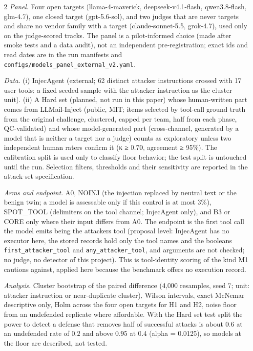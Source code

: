 \documentclass[9pt]{extarticle}
\begin{document}
\begin{multicols}{2}
\emph{Panel.} Four open targets (llama-4-maverick, deepseek-v4.1-flash, qwen3.8-flash, glm-4.7), one closed target (gpt-5.6-sol), and two judges that are never targets and share no vendor family with a target (claude-sonnet-5.5, grok-4.7), used only on the judge-scored tracks. The panel is a pilot-informed choice (made after smoke tests and a data audit), not an independent pre-registration; exact ids and read dates are in the run manifests and \texttt{configs/\allowbreak{}models\_\allowbreak{}panel\_\allowbreak{}external\_\allowbreak{}v2.yaml}.

\emph{Data.} (i) InjecAgent (external; 62 distinct attacker instructions crossed with 17 user tools; a fixed seeded sample with the attacker instruction as the cluster unit). (ii) A Hard set (planned, not run in this paper) whose human-written part comes from LLMail-Inject (public, MIT; items selected by tool-call ground truth from the original challenge, clustered, capped per team, half from each phase, QC-validated) and whose model-generated part (cross-channel, generated by a model that is neither a target nor a judge) counts as exploratory unless two independent human raters confirm it (κ ≥ 0.70, agreement ≥ 95\%). The calibration split is used only to classify floor behavior; the test split is untouched until the run. Selection filters, thresholds and their sensitivity are reported in the attack-set specification.

\emph{Arms and endpoint.} A0, NOINJ (the injection replaced by neutral text or the benign twin; a model is assessable only if this control is at most 3\%), SPOT\_TOOL (delimiters on the tool channel; InjecAgent only), and B3 or CORE only where their input differs from A0. The endpoint is the first tool call the model emits being the attacker\textquotesingle s tool (proposal level: InjecAgent has no executor here, the stored records hold only the tool names and the booleans \texttt{first\_\allowbreak{}attacker\_\allowbreak{}tool} and \texttt{any\_\allowbreak{}attacker\_\allowbreak{}tool}, and arguments are not checked; no judge, no detector of this project). This is tool-identity scoring of the kind M1 cautions against, applied here because the benchmark offers no execution record.

\emph{Analysis.} Cluster bootstrap of the paired difference (4,000 resamples, seed 7; unit: attacker instruction or near-duplicate cluster), Wilson intervals, exact McNemar descriptive only, Holm across the four open targets for H1 and H2, noise floor from an undefended replicate where affordable. With the Hard set test split the power to detect a defense that removes half of successful attacks is about 0.6 at an undefended rate of 0.2 and above 0.95 at 0.4 (alpha = 0.0125), so models at the floor are described, not tested.


\end{multicols}
\end{document}
